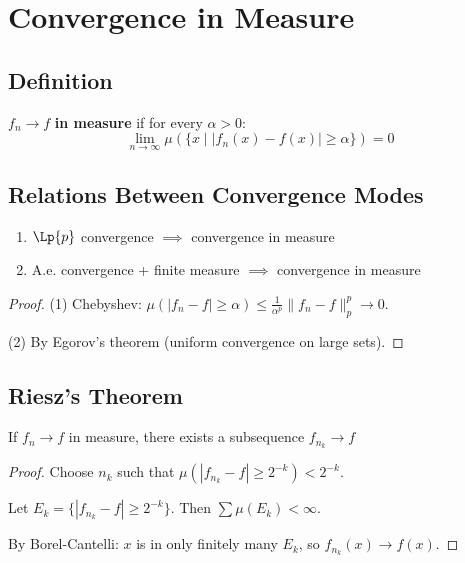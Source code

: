 \chapter{Convergence in Measure}

\section{Definition}

\begin{definition}
$f_n \to f$ \textbf{in measure} if for every $\alpha > 0$:
\[ \lim_{n \to \infty} \mu(\{x \mid |f_n(x) - f(x)| \geq \alpha\}) = 0 \]
\end{definition}

\section{Relations Between Convergence Modes}

\begin{proposition}
\begin{enumerate}
    \item $\Lp{p}$ convergence $\implies$ convergence in measure
    \item A.e. convergence + finite measure $\implies$ convergence in measure
\end{enumerate}
\end{proposition}

\begin{proof}
(1) Chebyshev: $\mu(|f_n - f| \geq \alpha) \leq \frac{1}{\alpha^p}\|f_n - f\|_p^p \to 0$.

(2) By Egorov's theorem (uniform convergence on large sets).
\end{proof}

\section{Riesz's Theorem}

\begin{theorem}
If $f_n \to f$ in measure, there exists a subsequence $f_{n_k} \to f$ \almosteverywhere{}
\end{theorem}

\begin{proof}
Choose $n_k$ such that $\mu(|f_{n_k} - f| \geq 2^{-k}) < 2^{-k}$.

Let $E_k = \{|f_{n_k} - f| \geq 2^{-k}\}$. Then $\sum \mu(E_k) < \infty$.

By Borel-Cantelli: \almosteverywhere{} $x$ is in only finitely many $E_k$, so $f_{n_k}(x) \to f(x)$.
\end{proof}


